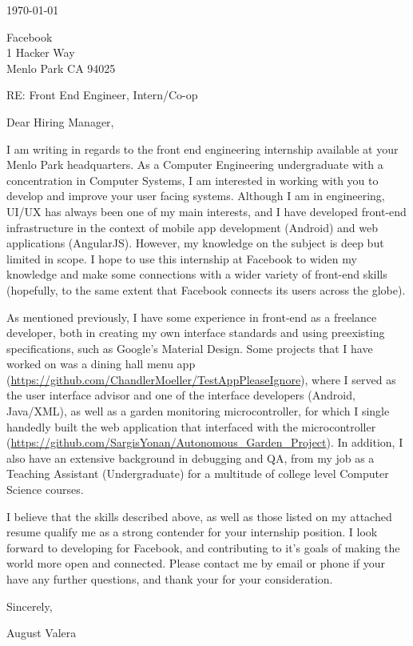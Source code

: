 \documentclass[11pt]{article}
\author{August Valera}
\begin{document}

\today

\vspace{12pt}
Facebook \\
1 Hacker Way \\
Menlo Park CA 94025

\vspace{12pt}

RE: Front End Engineer, Intern/Co-op

\vspace{12pt}
Dear Hiring Manager,

\vspace{12pt}
I am writing in regards to the front end engineering internship available at
your Menlo Park headquarters. As a Computer Engineering undergraduate with a
concentration in Computer Systems, I am interested in working with you to
develop and improve your user facing systems. Although I am in engineering,
UI/UX has always been one of my main interests, and I have developed front-end
infrastructure in the context of mobile app development (Android) and web
applications (AngularJS). However, my knowledge on the subject is deep but
limited in scope. I hope to use this internship at Facebook to widen my
knowledge and make some connections with a wider variety of front-end skills
(hopefully, to the same extent that Facebook connects its users across the
globe).

As mentioned previously, I have some experience in front-end as a freelance
developer, both in creating my own interface standards and using preexisting
specifications, such as Google's Material Design. Some projects that I have
worked on was a dining hall menu app
(\url{https://github.com/ChandlerMoeller/TestAppPleaseIgnore}), where I served
as the user interface advisor and one of the interface developers (Android,
Java/XML), as well as a garden monitoring microcontroller, for which I single
handedly built the web application that interfaced with the microcontroller
(\url{https://github.com/SargisYonan/Autonomous_Garden_Project}). In addition, I
also have an extensive background in debugging and QA, from my job as a Teaching
Assistant (Undergraduate) for a multitude of college level Computer Science
courses.

I believe that the skills described above, as well as those listed on my
attached resume qualify me as a strong contender for your internship position. I
look forward to developing for Facebook, and contributing to it's goals of
making the world more open and connected. Please contact me by email or phone if
your have any further questions, and thank your for your consideration.

\vspace{12pt}
Sincerely,

\vspace{24pt}
August Valera
\end{document}
